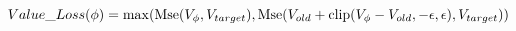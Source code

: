 $$Value\_Loss(\phi) = \max({\rm Mse}(V_{\phi}, V_{target}), {\rm Mse}(V_{old} + {\rm clip}(V_{\phi} - V_{old}, -\epsilon, \epsilon), V_{target}))$$
